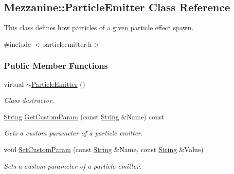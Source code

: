 \hypertarget{classMezzanine_1_1ParticleEmitter}{
\subsection{Mezzanine::ParticleEmitter Class Reference}
\label{classMezzanine_1_1ParticleEmitter}
}


This class defines how particles of a given particle effect spawn.  




{\ttfamily \#include $<$particleemitter.h$>$}

\subsubsection*{Public Member Functions}
\begin{DoxyCompactItemize}
\item 
\hypertarget{classMezzanine_1_1ParticleEmitter_a066a6652acdbc1cc9765b880d0f3a195}{
virtual \hyperlink{classMezzanine_1_1ParticleEmitter_a066a6652acdbc1cc9765b880d0f3a195}{$\sim$ParticleEmitter} ()}
\label{classMezzanine_1_1ParticleEmitter_a066a6652acdbc1cc9765b880d0f3a195}

\begin{DoxyCompactList}\small\item\em Class destructor. \item\end{DoxyCompactList}\item 
\hyperlink{namespaceMezzanine_acf9fcc130e6ebf08e3d8491aebcf1c86}{String} \hyperlink{classMezzanine_1_1ParticleEmitter_a84747879e99f839d26ee2d7eefb3d44e}{GetCustomParam} (const \hyperlink{namespaceMezzanine_acf9fcc130e6ebf08e3d8491aebcf1c86}{String} \&Name) const 
\begin{DoxyCompactList}\small\item\em Gets a custom parameter of a particle emitter. \item\end{DoxyCompactList}\item 
void \hyperlink{classMezzanine_1_1ParticleEmitter_a7f29a1a044f72bd429f79e3f4cc10622}{SetCustomParam} (const \hyperlink{namespaceMezzanine_acf9fcc130e6ebf08e3d8491aebcf1c86}{String} \&Name, const \hyperlink{namespaceMezzanine_acf9fcc130e6ebf08e3d8491aebcf1c86}{String} \&Value)
\begin{DoxyCompactList}\small\item\em Sets a custom parameter of a particle emitter. \item\end{DoxyCompactList}\end{DoxyCompactItemize}
